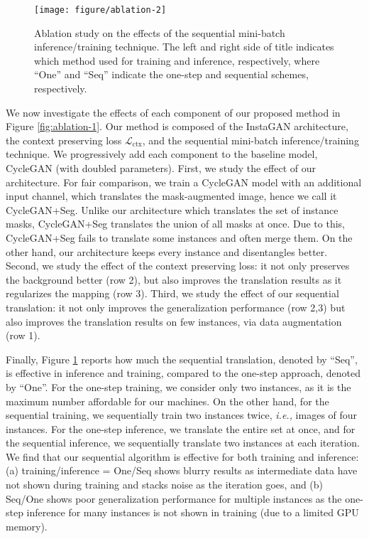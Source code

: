 \documentclass{article} \usepackage{iclr2019_conference,times}
\begin{document}
\begin{figure}[t]
    \vspace{-0.2in}
	\texttt{[image: figure/ablation-2]}
	\caption{
	Ablation study on the effects of the sequential mini-batch inference/training technique.
	The left and right side of title indicates which method used for training and inference, respectively, where
	``One'' and ``Seq'' indicate the one-step and sequential schemes, respectively.
} \label{fig:ablation-2}
	\vspace{-0.1in}
\end{figure}

We now investigate the effects of each component of our proposed method in Figure \ref{fig:ablation-1}.
Our method is composed of the InstaGAN architecture, the context preserving loss $\mathcal{L}_\text{ctx}$,
and the sequential mini-batch inference/training technique.
We progressively add each component to the baseline model, CycleGAN (with doubled parameters).
First, we study the effect of our architecture.
For fair comparison, we train a CycleGAN model with an additional input channel,
which translates the mask-augmented image, hence we call it CycleGAN+Seg.
Unlike our architecture which translates the set of instance masks,
CycleGAN+Seg translates the union of all masks at once.
Due to this, CycleGAN+Seg fails to translate some instances and often merge them.
On the other hand, our architecture keeps every instance and disentangles better.
Second, we study the effect of the context preserving loss: it not only preserves the background better (row 2),
but also improves the translation results as it regularizes the mapping (row 3).
Third, we study the effect of our sequential translation:
it not only improves the generalization performance (row 2,3)
but also improves the translation results on few instances, via data augmentation (row 1).

Finally, Figure \ref{fig:ablation-2} reports how much the sequential translation,
denoted by ``Seq'', is effective in inference and training, compared to the one-step approach, denoted by ``One''.
For the one-step training,
we consider only two instances, as it is the maximum number affordable for our machines.
On the other hand, for the sequential training,  we sequentially train two instances twice, \textit{i.e.,} images of four instances.
For the one-step inference, we translate the entire set at once,
and for the sequential inference, we sequentially translate two instances at each iteration.
We find that our sequential algorithm is effective for both training and inference:
(a) training/inference = One/Seq shows blurry results as intermediate data have not shown during training and stacks noise as the iteration goes,
and (b) Seq/One shows poor generalization performance for multiple instances as
the one-step inference for many instances is not shown in training (due to a limited GPU memory).
\end{document}
